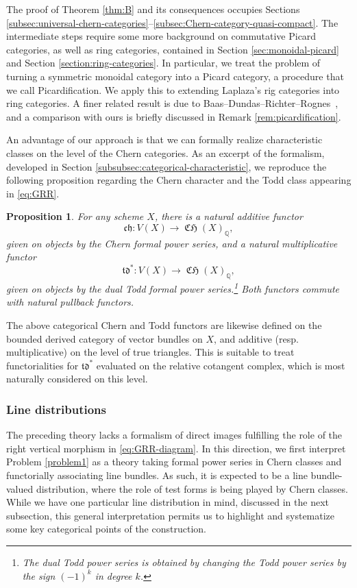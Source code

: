 \documentclass[11pt]{article}
\newcommand{\resp}{resp.\xspace}
\theoremstyle{plain}
\newtheorem{prop}[thm]{Proposition}
\theoremstyle{definition}
\newcommand{\QBbb}{\mathbb Q}
\newcommand{\chfrak}{\mathfrak {ch}}
\newcommand{\tdfrak}{\mathfrak {td}}
\DeclareMathOperator{\CHfrak}{\mathfrak{CH}}
\begin{document}
The proof of Theorem \ref{thm:B} and its consequences occupies Sections \ref{subsec:universal-chern-categories}--\ref{subsec:Chern-category-quasi-compact}. The intermediate steps require some more background on commutative Picard categories, as well as ring categories, contained in Section \ref{sec:monoidal-picard} and Section \ref{section:ring-categories}. In particular, we treat the problem of turning a symmetric monoidal category into a Picard category, a procedure that we call Picardification. We apply this to extending Laplaza's rig categories \cite{Laplaza} into ring categories. A finer related result is due to Baas--Dundas--Richter--Rognes~\cite{BDRR}, and a comparison with ours is briefly discussed in Remark \ref{rem:picardification}.

An advantage of our approach is that we can formally realize characteristic classes on the level of the Chern categories. As an excerpt of the formalism, developed in Section \ref{subsubsec:categorical-characteristic}, we reproduce the following proposition regarding the Chern character and the Todd class appearing in \eqref{eq:GRR}.

\begin{prop}\label{propB}
For any scheme $X$, there is a natural additive functor
\begin{displaymath}
\chfrak : V(X) \to \CHfrak(X)_\QBbb,
\end{displaymath}
given on objects by the Chern formal power series, and a natural multiplicative functor
\begin{displaymath}
\tdfrak^{\ast} : V(X) \to \CHfrak(X)_\QBbb,
\end{displaymath}
given on objects by the dual Todd formal power series.\footnote{The dual Todd power series is obtained by changing the Todd power series by the sign $(-1)^{k}$ in degree $k$.} Both functors commute with natural pullback functors.

\end{prop}
The above categorical Chern and Todd functors are likewise defined on the bounded derived category of vector bundles on $X$, and additive (\resp multiplicative) on the level of true triangles. This is suitable to treat functorialities for $\tdfrak^{\ast}$ evaluated on the relative cotangent complex, which is most naturally considered on this level.

\subsubsection*{Line distributions}
The preceding theory lacks a formalism of direct images fulfilling the role of the right vertical morphism in \eqref{eq:GRR-diagram}. In this direction, we first interpret Problem \ref{problem1} as a theory taking formal power series in Chern classes and functorially associating line bundles. As such, it is expected to be a line bundle-valued distribution, where the role of test forms is being played by Chern classes. While we have one particular line distribution in mind, discussed in the next subsection, this general interpretation permits us to highlight and systematize some key categorical points of the construction.
\end{document}
